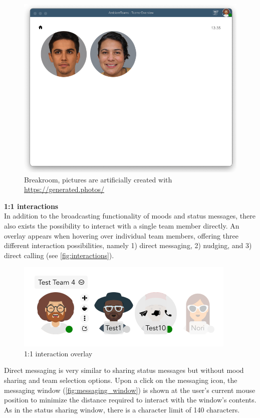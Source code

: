 \begin{figure}[h]
    \centering
    \includegraphics[width=.8\linewidth]{./images/breakroom.png}
    \caption{Breakroom, pictures are artificially created with \url{https://generated.photos/}}
    \label{fig:breakroom}
\end{figure}

\medskip\noindent\textbf{1:1 interactions} \\
In addition to the broadcasting functionality of moods and status messages, there also exists the possibility to interact with a single team member directly. An overlay appears when hovering over individual team members, offering three different interaction possibilities, namely 1) direct messaging, 2) nudging, and 3) direct calling (see \autoref{fig:interactions}).

\begin{figure}[h]
    \centering
    \includegraphics[width=.4\linewidth]{./images/interactions.png}
    \caption{1:1 interaction overlay }
    \label{fig:interactions}
\end{figure}

Direct messaging is very similar to sharing status messages but without mood sharing and team selection options. Upon a click on the messaging icon, the messaging window (\autoref{fig:messaging_window}) is shown at the user's current mouse position to minimize the distance required to interact with the window's contents. As in the status sharing window, there is a character limit of 140 characters.


